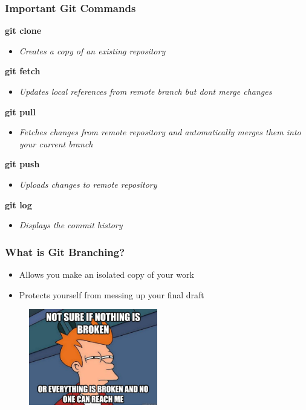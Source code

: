\documentclass{beamer}
\begin{document}
\begin{frame}
	\frametitle{\textbf{Important Git Commands}}

	\textbf{git clone}
	\begin{itemize}
		\item \textit{Creates a copy of an existing repository}
	\end{itemize}
	\vspace{0.25cm}

	\textbf{git fetch}
	\begin{itemize}
		\item \textit{Updates local references from remote branch but dont merge changes}
	\end{itemize}
	\vspace{0.25cm}

	\textbf{git pull}
	\begin{itemize}
		\item \textit{Fetches changes from remote repository and automatically merges them into your current branch}
	\end{itemize}
	\vspace{0.25cm}

	\textbf{git push}
	\begin{itemize}
		\item \textit{Uploads changes to remote repository} 
	\end{itemize}
	\vspace{0.25cm}

	\textbf{git log}
	\begin{itemize}
		\item \textit{Displays the commit history}
	\end{itemize}

\end{frame}

\begin{frame}
	\frametitle{\textbf{What is Git Branching?}}

	\begin{itemize}
		\item Allows you make an isolated copy of your work 
		\item Protects yourself from messing up your final draft 
	\end{itemize}
	\vspace{0.25cm}

	\begin{figure}[h]
			\centering
			\includegraphics[width=0.5\textwidth]{img/broken.jpeg} 
	\end{figure}

\end{frame}
\end{document}
